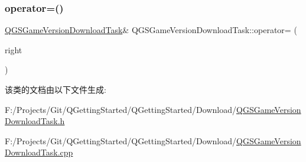 \subsubsection{\texorpdfstring{operator=()}{operator=()}\hspace{0.1cm}{\footnotesize\ttfamily [2/2]}}
{\footnotesize\ttfamily \mbox{\hyperlink{class_q_g_s_game_version_download_task}{Q\+G\+S\+Game\+Version\+Download\+Task}}\& Q\+G\+S\+Game\+Version\+Download\+Task\+::operator= (\begin{DoxyParamCaption}\item[{\mbox{\hyperlink{class_q_g_s_game_version_download_task}{Q\+G\+S\+Game\+Version\+Download\+Task}} \&\&}]{right }\end{DoxyParamCaption})\hspace{0.3cm}{\ttfamily [delete]}}



该类的文档由以下文件生成\+:\begin{DoxyCompactItemize}
\item 
F\+:/\+Projects/\+Git/\+Q\+Getting\+Started/\+Q\+Getting\+Started/\+Download/\mbox{\hyperlink{_q_g_s_game_version_download_task_8h}{Q\+G\+S\+Game\+Version\+Download\+Task.\+h}}\item 
F\+:/\+Projects/\+Git/\+Q\+Getting\+Started/\+Q\+Getting\+Started/\+Download/\mbox{\hyperlink{_q_g_s_game_version_download_task_8cpp}{Q\+G\+S\+Game\+Version\+Download\+Task.\+cpp}}\end{DoxyCompactItemize}
